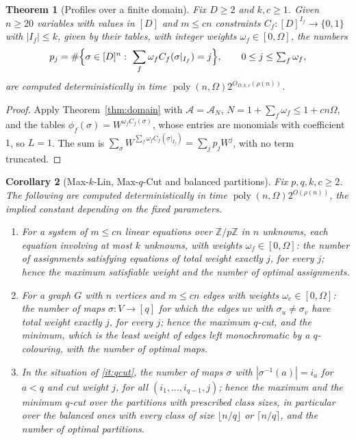 \documentclass[11pt,reqno]{amsart}
\numberwithin{equation}{section}
\theoremstyle{plain}
\newtheorem{theorem}{Theorem}[section]
\newtheorem{corollary}[theorem]{Corollary}
\theoremstyle{definition}
\theoremstyle{remark}
\DeclareMathOperator{\poly}{poly}
\newcommand{\A}{\mathcal{A}}
\newcommand{\Z}{\mathbb{Z}}
\newcommand{\rhon}{\rho}
\begin{document}
\begin{theorem}[Profiles over a finite domain]\label{thm:domainprofile}
Fix $D\ge2$ and $k,c\ge1$. Given $n\ge20$ variables with values in $[D]$ and
$m\le cn$ constraints $C_f:[D]^{I_f}\to\{0,1\}$ with $|I_f|\le k$, given by
their tables, with integer weights $\omega_f\in[0,\Omega]$, the numbers
\[
  p_j=\#\Bigl\{\sigma\in[D]^n:\ \sum_f\omega_fC_f(\sigma|_{I_f})=j\Bigr\},\qquad
  0\le j\le\textstyle\sum_f\omega_f,
\]
are computed deterministically in time $\poly(n,\Omega)2^{O_{D,k,c}(\rhon(n))}$.
\end{theorem}

\begin{proof}
Apply Theorem~\ref{thm:domain} with $\A=\A_N$, $N=1+\sum_f\omega_f\le 1+cn\Omega$,
and the tables $\phi_f(\sigma)=W^{\omega_fC_f(\sigma)}$, whose entries are
monomials with coefficient $1$, so $L=1$. The sum is
$\sum_\sigma W^{\sum_f\omega_fC_f(\sigma|_{I_f})}=\sum_jp_jW^{j}$, with no term
truncated.
\end{proof}

\begin{corollary}[Max-$k$-Lin, Max-$q$-Cut and balanced partitions]\label{cor:qcut}
Fix $p,q,k,c\ge2$. The following are computed deterministically in time
$\poly(n,\Omega)2^{O(\rhon(n))}$, the implied constant depending on the fixed
parameters.
\begin{enumerate}[label=\textup{(\roman*)},leftmargin=2.2em]
\item\label{it:klin} For a system of $m\le cn$ linear equations over $\Z/p\Z$ in
$n$ unknowns, each equation involving at most $k$ unknowns, with weights
$\omega_f\in[0,\Omega]$: the number of assignments satisfying equations of total
weight exactly $j$, for every $j$; hence the maximum satisfiable weight and the
number of optimal assignments.
\item\label{it:qcut} For a graph $G$ with $n$ vertices and $m\le cn$ edges with
weights $\omega_e\in[0,\Omega]$: the number of maps $\sigma:V\to[q]$ for which
the edges $uv$ with $\sigma_u\ne\sigma_v$ have total weight exactly $j$, for
every $j$; hence the maximum $q$-cut, and the minimum, which is the least
weight of edges left monochromatic by a $q$-colouring, with the number of
optimal maps.
\item\label{it:balanced} In the situation of \ref{it:qcut}, the number of maps
$\sigma$ with $|\sigma^{-1}(a)|=i_a$ for $a<q$ and cut weight $j$, for all
$(i_1,\dots,i_{q-1},j)$; hence the maximum and the minimum $q$-cut over the
partitions with prescribed class sizes, in particular over the balanced ones
with every class of size $\lfloor n/q\rfloor$ or $\lceil n/q\rceil$, and the
number of optimal partitions.
\end{enumerate}
\end{corollary}
\end{document}
